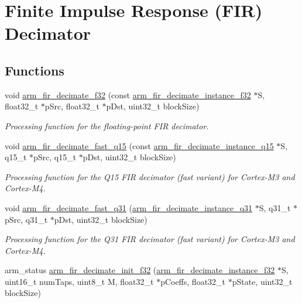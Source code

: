 \hypertarget{group___f_i_r__decimate}{\section{Finite Impulse Response (F\-I\-R) Decimator}
\label{group___f_i_r__decimate}
}
\subsection*{Functions}
\begin{DoxyCompactItemize}
\item 
void \hyperlink{group___f_i_r__decimate_ga25aa3d58a90bf91b6a82272a0bc518f7}{arm\-\_\-fir\-\_\-decimate\-\_\-f32} (const \hyperlink{structarm__fir__decimate__instance__f32}{arm\-\_\-fir\-\_\-decimate\-\_\-instance\-\_\-f32} $\ast$S, float32\-\_\-t $\ast$p\-Src, float32\-\_\-t $\ast$p\-Dst, uint32\-\_\-t block\-Size)
\begin{DoxyCompactList}\small\item\em Processing function for the floating-\/point F\-I\-R decimator. \end{DoxyCompactList}\item 
void \hyperlink{group___f_i_r__decimate_ga3f434c9a5d3b4e68061feac0714ea2ac}{arm\-\_\-fir\-\_\-decimate\-\_\-fast\-\_\-q15} (const \hyperlink{structarm__fir__decimate__instance__q15}{arm\-\_\-fir\-\_\-decimate\-\_\-instance\-\_\-q15} $\ast$S, q15\-\_\-t $\ast$p\-Src, q15\-\_\-t $\ast$p\-Dst, uint32\-\_\-t block\-Size)
\begin{DoxyCompactList}\small\item\em Processing function for the Q15 F\-I\-R decimator (fast variant) for Cortex-\/\-M3 and Cortex-\/\-M4. \end{DoxyCompactList}\item 
void \hyperlink{group___f_i_r__decimate_ga3c18cc3d0548a410c577f1bead9582b7}{arm\-\_\-fir\-\_\-decimate\-\_\-fast\-\_\-q31} (\hyperlink{structarm__fir__decimate__instance__q31}{arm\-\_\-fir\-\_\-decimate\-\_\-instance\-\_\-q31} $\ast$S, q31\-\_\-t $\ast$p\-Src, q31\-\_\-t $\ast$p\-Dst, uint32\-\_\-t block\-Size)
\begin{DoxyCompactList}\small\item\em Processing function for the Q31 F\-I\-R decimator (fast variant) for Cortex-\/\-M3 and Cortex-\/\-M4. \end{DoxyCompactList}\item 
arm\-\_\-status \hyperlink{group___f_i_r__decimate_gaaa2524b08220fd6c3f753e692ffc7d3b}{arm\-\_\-fir\-\_\-decimate\-\_\-init\-\_\-f32} (\hyperlink{structarm__fir__decimate__instance__f32}{arm\-\_\-fir\-\_\-decimate\-\_\-instance\-\_\-f32} $\ast$S, uint16\-\_\-t num\-Taps, uint8\-\_\-t M, float32\-\_\-t $\ast$p\-Coeffs, float32\-\_\-t $\ast$p\-State, uint32\-\_\-t block\-Size)

\end{DoxyCompactItemize}

